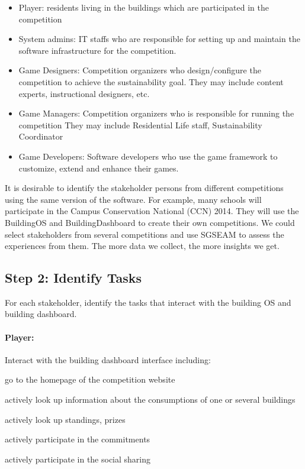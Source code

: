 \documentclass[11pt]{article}
\begin{document}
\begin{itemize}
\item Player:
    residents living in the buildings which are participated in the competition

\item System admins:
    IT staffs who are responsible for setting up and maintain the software infrastructure for the competition.
    
\item Game Designers:
    Competition organizers who design/configure the competition to achieve the sustainability goal.
    They may include content experts, instructional designers, etc.

\item Game Managers:
    Competition organizers who is responsible for running the competition
    They may include Residential Life staff, Sustainability Coordinator

\item Game Developers:
    Software developers who use the game framework to customize, extend and enhance their games.    
\end{itemize}

It is desirable to identify the stakeholder persons from different competitions using the same version of the software. For example, many schools will participate in the Campus Conservation National (CCN) 2014. They will use the BuildingOS and BuildingDashboard to create their own competitions. We could select stakeholders from several competitions and use SGSEAM to assess the experiences from them. The more data we collect, the more insights we get.

\subsection{Step 2: Identify Tasks} 
For each stakeholder, identify the tasks that interact with the building OS and building dashboard.

\paragraph{Player:} Interact with the building dashboard interface including:
    \begin{compactitem}
    \item go to the homepage of the competition website
    \item actively look up information about the consumptions of one or several buildings
    \item actively look up standings, prizes
    \item actively participate in the commitments
    \item actively participate in the social sharing
    \end{compactitem}
\end{document}
